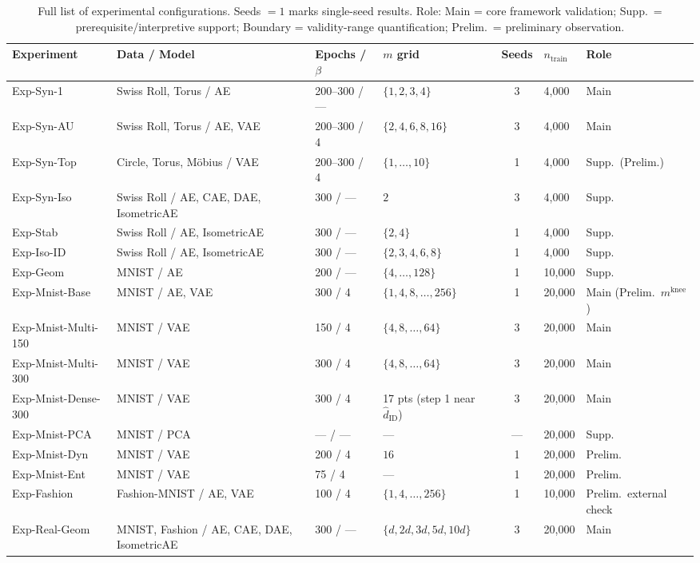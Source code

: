 \documentclass[11pt,a4paper]{jsarticle}
\newcommand{\mknee}{m^{\mathrm{knee}}}
\begin{document}
\begin{table}[H]
\centering
\caption{Full list of experimental configurations. Seeds $=1$ marks single-seed results. Role: Main = core framework validation; Supp.\ = prerequisite/interpretive support; Boundary = validity-range quantification; Prelim.\ = preliminary observation.}
\label{tab:exp_full}
\footnotesize
\begin{tabular}{p{3.0cm}p{2.9cm}p{2.2cm}p{2.9cm}cp{1.2cm}p{1.5cm}}
\toprule
Experiment & Data / Model & Epochs / $\beta$ & $m$ grid & Seeds & $n_\mathrm{train}$ & Role \\
\midrule
Exp-Syn-1 & Swiss Roll, Torus / AE & 200--300 / --- & $\{1,2,3,4\}$ & 3 & 4,000 & Main \\
Exp-Syn-AU & Swiss Roll, Torus / AE, VAE & 200--300 / 4 & $\{2,4,6,8,16\}$ & 3 & 4,000 & Main \\
Exp-Syn-Top & Circle, Torus, M\"obius / VAE & 200--300 / 4 & $\{1,\ldots,10\}$ & 1 & 4,000 & Supp.\ (Prelim.) \\
Exp-Syn-Iso & Swiss Roll / AE, CAE, DAE, IsometricAE & 300 / --- & $2$ & 3 & 4,000 & Supp. \\
Exp-Stab & Swiss Roll / AE, IsometricAE & 300 / --- & $\{2,4\}$ & 1 & 4,000 & Supp. \\
Exp-Iso-ID & Swiss Roll / AE, IsometricAE & 300 / --- & $\{2,3,4,6,8\}$ & 1 & 4,000 & Supp. \\
Exp-Geom & MNIST / AE & 200 / --- & $\{4,\ldots,128\}$ & 1 & 10,000 & Supp. \\
Exp-Mnist-Base & MNIST / AE, VAE & 300 / 4 & $\{1,4,8,\ldots,256\}$ & 1 & 20,000 & Main (Prelim.\ $\mknee$) \\
Exp-Mnist-Multi-150 & MNIST / VAE & 150 / 4 & $\{4,8,\ldots,64\}$ & 3 & 20,000 & Main \\
Exp-Mnist-Multi-300 & MNIST / VAE & 300 / 4 & $\{4,8,\ldots,64\}$ & 3 & 20,000 & Main \\
Exp-Mnist-Dense-300 & MNIST / VAE & 300 / 4 & 17 pts (step 1 near $\hat{d}_\mathrm{ID}$) & 3 & 20,000 & Main \\
Exp-Mnist-PCA & MNIST / PCA & --- / --- & --- & --- & 20,000 & Supp. \\
Exp-Mnist-Dyn & MNIST / VAE & 200 / 4 & $16$ & 1 & 20,000 & Prelim. \\
Exp-Mnist-Ent & MNIST / VAE & 75 / 4 & --- & 1 & 20,000 & Prelim. \\
Exp-Fashion & Fashion-MNIST / AE, VAE & 100 / 4 & $\{1,4,\ldots,256\}$ & 1 & 10,000 & Prelim.\ external check \\
Exp-Real-Geom & MNIST, Fashion / AE, CAE, DAE, IsometricAE & 300 / --- & $\{d,2d,3d,5d,10d\}$ & 3 & 20,000 & Main \\

\end{tabular}
\end{table}
\end{document}
